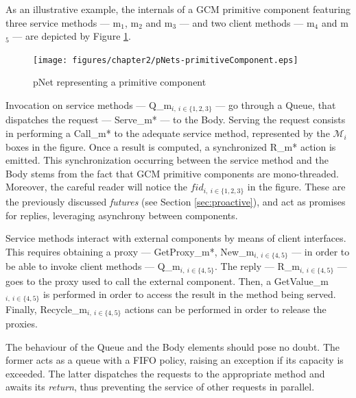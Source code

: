 	
		As an illustrative example, the internals of a GCM primitive component featuring three service methods 
		--- \textsf{m$_1$}, \textsf{m$_2$} and \textsf{m$_3$} --- 
	and two client methods --- \textsf{m$_4$} and \textsf{m$_5$} --- are depicted by Figure \ref{fig:pnetp}. 
	
	\begin{figure}%
		\centering
	   \texttt{[image: figures/chapter2/pNets-primitiveComponent.eps]} %
   		\caption{pNet representing a primitive component}
   		\label{fig:pnetp}
		\end{figure}		
	
	
		\noindent Invocation on service methods --- \textsf{Q\_m$_{i, \ i \in \{1, 2, 3\}}$} --- go through 
		a \textsf{Queue}, that dispatches the request ---
	\textsf{Serve\_m*} --- to the \textsf{Body}. Serving the request consists in performing a \textsf{Call\_m*} to the
	adequate service method, represented by the $\mathcal{M}_i$ boxes in the figure. Once a result is computed, a 
	synchronized \textsf{R\_m*} action is emitted. This synchronization occurring between the service method and the
	\textsf{Body} stems from the fact that GCM primitive components are mono-threaded. Moreover, the careful reader will
	notice the $fid_{i, \ i \in \{1, 2, 3\}}$ in the figure. These are the previously discussed \textit{futures} (see Section \ref{sec:proactive}), 
	and act as promises for replies, leveraging
	asynchrony between components.
	
		Service methods interact with external components by means of client interfaces. This requires obtaining a proxy
		--- \textsf{GetProxy\_m*}, \textsf{New\_m$_{i, \ i \in \{4, 5\}}$} --- in order to be able to invoke client methods ---
		\textsf{Q\_m$_{i, \ i \in \{4, 5\}}$}. The reply --- \textsf{R\_m$_{i, \ i \in \{4, 5\}}$} --- goes to the proxy used to 
		call the external component. Then, a \textsf{GetValue\_m$_{i, \ i \in \{4, 5\}}$} is performed in order to access
		the result in the method being served. Finally, \textsf{Recycle\_m$_{i, \ i \in \{4, 5\}}$} actions can be performed
		in order to release the proxies.
	
		The behaviour of the \textsf{Queue} and the \textsf{Body} elements should pose no doubt. The former acts as
		a queue with a \ac{FIFO} policy, raising an exception if its capacity is exceeded. 
		The latter dispatches the requests to the appropriate
		method and awaits its \textit{return}, thus preventing the service of other requests in parallel.
	
